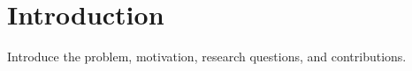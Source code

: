 \chapter{Introduction}
\label{ch:introduction}

Introduce the problem, motivation, research questions, and contributions.
